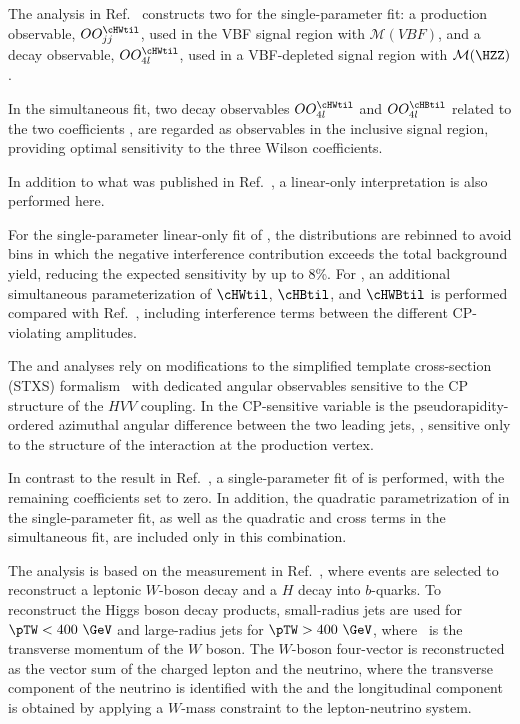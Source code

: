 \documentclass[PAPER, atlasdraft=false, cernpreprint,UKenglish, texmf, orcidlogo]{atlasdoc}
\begin{document}
The \HZZ analysis in Ref.~\cite{HIGG-2018-30} constructs two \OO for the single-parameter fit: a production observable, $OO_{jj}^{\cHWtil}$, used in the VBF signal region with $\mathcal{M} (VBF)$, and a decay observable, $OO_{4l}^{\cHWtil}$, used in a VBF-depleted signal region with $\mathcal{M} (\HZZ)$.

In the simultaneous fit, two decay observables $OO_{4l}^{\cHWtil}$ and $OO_{4l}^{\cHBtil}$ related to the two coefficients \cHWtil, \cHBtil are regarded as observables in the inclusive \HZZ signal region, providing optimal sensitivity to the three Wilson coefficients.



In addition to what was published in Ref.~\cite{HIGG-2018-30}, a linear-only interpretation is also performed here.

For the single-parameter linear-only fit of \cHWtil, the \OO distributions are rebinned to avoid bins in which the negative interference contribution exceeds the total background yield, reducing the expected sensitivity by up to 8\%. For \Htautau, an additional simultaneous parameterization of $\cHWtil$, $\cHBtil$, and $\cHWBtil$ is performed compared with Ref.~\cite{HIGP-2024-09}, including interference terms between the different CP-violating amplitudes.






The \HWW and \WHbb analyses rely on modifications to the simplified template cross-section (STXS) formalism~\cite{STXS-LesHouches,STXS-Stage1.1,deFlorian:2016spz} with dedicated angular observables sensitive to the CP structure of the $HVV$ coupling. In \HWW the CP-sensitive variable is the pseudorapidity-ordered azimuthal angular difference between the two leading jets, \DPhijj, sensitive only to the structure of the interaction at the production vertex.

In contrast to the result in Ref.~\cite{HIGP-2024-07}, a single-parameter fit of \cHWtil is performed, with the remaining coefficients set to zero.
In addition, the quadratic parametrization of \cHWtil in the single-parameter fit, as well as the quadratic and cross terms in the simultaneous fit, are included only in this combination.



The \WHbb analysis is based on the measurement in Ref.~\cite{HIGG-2020-20}, where events are selected to reconstruct a leptonic $W$-boson decay and a $H$ decay into $b$-quarks. To reconstruct the Higgs boson decay products, small-radius jets are used for $\pTW<400~\GeV$ and large-radius jets for $\pTW>400~\GeV$, where \pTW~is the transverse momentum of the $W$ boson. The $W$-boson four-vector is reconstructed as the vector sum of the charged lepton and the neutrino, where the transverse component of the neutrino is identified with the \MET and the longitudinal component is obtained by applying a $W$-mass constraint to the lepton-neutrino system.
\end{document}
